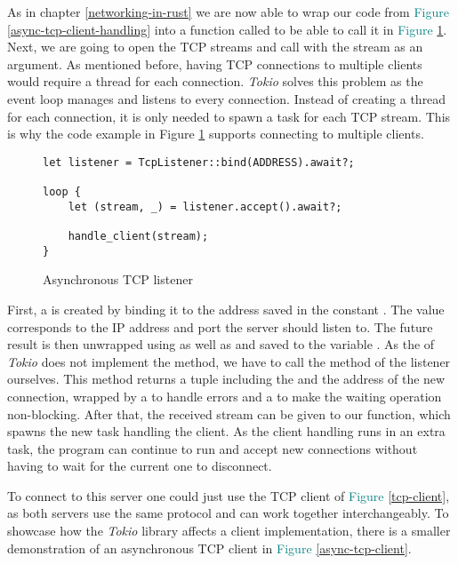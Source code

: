 As in chapter \ref{networking-in-rust} we are now able to wrap our code from
\textcolor{teal}{Figure \ref{async-tcp-client-handling}} into a function called  to be able to
call it in \textcolor{teal}{Figure \ref{async-tcp-listener}}. Next, we are going to open the TCP streams and call
 with the stream as an argument. As mentioned before, having TCP connections to multiple clients
would require a thread for each connection. \textit{Tokio} solves this problem as the event loop manages and listens to
every connection. Instead of creating a thread for each connection, it is only needed to spawn a task for each TCP
stream. This is why the code example in Figure \textcolor{teal}{\ref{async-tcp-listener}} supports connecting to
multiple clients.

\begin{figure}[ht]
    \begin{verbatim}
let listener = TcpListener::bind(ADDRESS).await?;

loop {
    let (stream, _) = listener.accept().await?;

    handle_client(stream);
}
    \end{verbatim}
    \caption{Asynchronous TCP listener}
    \label{async-tcp-listener}
\end{figure}

First, a  is created by binding it to the address saved in the  constant
. The value corresponds to the IP address and port the server should listen to. The future result is
then unwrapped using  as well as  and saved to the variable . As the
 of \textit{Tokio} does not implement the  method, we have to call the 
method of the listener ourselves. This method returns a tuple including the  and the address of the new
connection, wrapped by a  to handle errors and a  to make the waiting operation non-blocking.
After that, the received stream can be given to our  function, which spawns the new task handling
the client. As the client handling runs in an extra task, the program can continue to run and accept new connections
without having to wait for the current one to disconnect.

To connect to this server one could just use the TCP client of \textcolor{teal}{Figure \ref{tcp-client}}, as both
servers use the same protocol and can work together interchangeably. To showcase how the \textit{Tokio} library affects
a client implementation, there is a smaller demonstration of an asynchronous TCP client in
\textcolor{teal}{Figure \ref{async-tcp-client}}.


